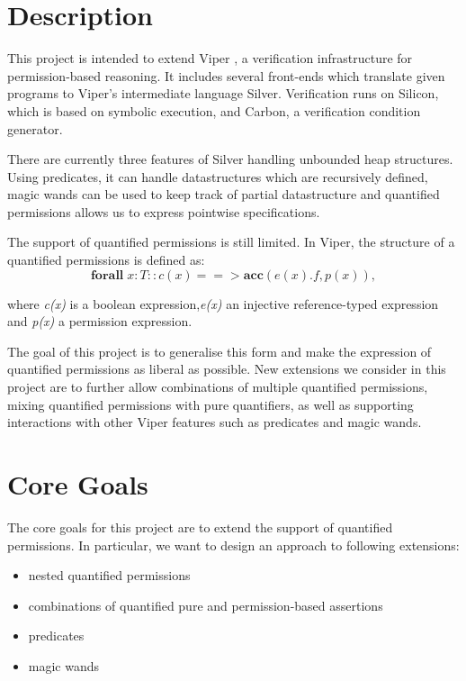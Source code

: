 \documentclass[12pt]{article}
\begin{document}
\maketitle

\section{Description}
This project is intended to extend Viper \cite{viper}, a verification infrastructure for permission-based reasoning. It includes several front-ends which translate given programs to Viper's intermediate language Silver. Verification runs on Silicon, which is based on symbolic execution, and Carbon, a verification condition generator.

There are currently three features of Silver handling unbounded heap structures. Using predicates, it can handle datastructures which are recursively defined, magic wands \cite{magicwand} can be used to keep track of partial datastructure and quantified permissions \cite{isc} allows us to express pointwise specifications. 

The support of quantified permissions is still limited. In Viper, the structure of a quantified permissions is defined as:
\newline 
\begin{equation}
	\mathbf{forall} \; x:T :: c(x) ==>\mathbf{acc}( e(x).f, p(x) ) ,
\end{equation}

where {\it c(x)} is  a boolean expression,{\it e(x)} an injective reference-typed expression and {\it p(x)} a permission expression.

The goal of this project is to generalise this form and make the expression of quantified permissions as liberal as possible. New extensions we consider in this project are to further allow combinations of multiple quantified permissions, mixing quantified permissions with pure quantifiers, as well as supporting interactions with other Viper features such as predicates and magic wands.

\section{Core Goals}
The core goals for this project are to extend the support of quantified permissions. In particular, we want to design an approach to following extensions: 
\begin{itemize}
\item nested quantified permissions
\item combinations of quantified pure and permission-based assertions
\item predicates 
\item magic wands
\end{itemize}
\end{document}

